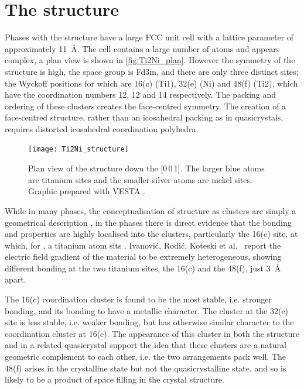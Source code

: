 \section{The \texorpdfstring{}{Ti2Ni} structure}
\FloatBarrier


Phases with the  structure have a large FCC unit cell with a lattice parameter of approximately \SI{11}{\angstrom}. The cell contains  a large number of atoms and appears complex, a plan view is shown in \autoref{fig:Ti2Ni_plan}. However the symmetry of the structure is high, the space group is Fd\={3}m, and there are only three distinct sites; the Wyckoff positions for which are 16(c) (Ti1), 32(e) (Ni) and 48(f) (Ti2), which have the coordination numbers 12, 12 and 14 respectively. The packing and ordering of these clusters creates the face-centred symmetry. The creation of a face-centred structure, rather than an icosahedral packing as in quasicrystals, requires distorted icosahedral coordination polyhedra.


\begin{figure}
\centering
\texttt{[image: Ti2Ni\_structure]}
\captionsetup{width=0.6\textwidth}
\caption[Plan view of the  structure.]{Plan view of the  structure down the [0\,0\,1]. The larger blue atoms are titanium sites and the smaller silver atoms are nickel sites. Graphic prepared with VESTA \cite{Momma2011}.\label{fig:Ti2Ni_plan}}
\end{figure}



While in many phases, the conceptualisation of structure as clusters are simply a geometrical description \cite{Steurer2006}, in the  phases there is direct evidence that the bonding and properties are highly localised into the clusters, particularly the 16(c) site, at which, for , a titanium atom sits \cite{Ivanovic2006}. Ivanovi\'c, Rodi\'c, Koteski et al.\ \cite{Ivanovic2006} report the electric field gradient of the material to be extremely heterogeneous, showing different bonding at the two titanium sites, the 16(c) and the 48(f), just \SI{3}{\angstrom} apart. 

The 16(c) coordination cluster is found to be the most stable, i.e. stronger bonding, and its bonding to have a metallic character. The cluster at the 32(e) site is less stable, i.e. weaker bonding, but has otherwise similar character to the coordination cluster at 16(c). The appearance of this cluster in both the  structure and in a related quasicrystal support the idea that these clusters are a natural geometric complement to each other, i.e. the two arrangements pack well. The 48(f) arises in the crystalline state but not the quasicrystalline state, and so is likely to be a product of space filling in the  crystal structure. 

